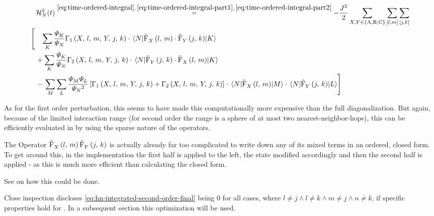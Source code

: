 \begin{equation}
    \label{eq:hn-integrated-second-order-final}
    \begin{split}
        &\HNOftOrder{2} \stackrel{\ref{eq:time-ordered-integral},\,\ref{eq:time-ordered-integral-part1},\,\ref{eq:time-ordered-integral-part2}}{=} 
        - \frac{J^2}{2} 
        \lsum[X,Y \in \left\{\text{A}, \text{B}, \text{C}\right\}] \fullneighborsum{l}{m}\fullneighborsum{j}{k}\\
        \left[         \vphantom{\lsum[K]}        \right.
        &\phantom{+}
        \lsum[K]
        \frac{\psiN[K]}{\psiN} 
        \Gamma_1 \left(X,\,l,\,m,\,Y,\,j,\,k\right)
        \cdot 
        \bracketHelper{N}{
            \VhamiltonianOperatorPart[]{$X$}{l}{m}
            \cdot 
            \VhamiltonianOperatorPart[]{$Y$}{j}{k}
            }{K}
        \\
        &+ 
        \lsum[K]
        \frac{\psiN[K]}{\psiN} 
        \Gamma_2 \left(X,\,l,\,m,\,Y,\,j,\,k\right)
        \cdot 
        \bracketHelper{N}{
            \VhamiltonianOperatorPart[]{$Y$}{j}{k}
        \cdot 
            \VhamiltonianOperatorPart[]{$X$}{l}{m}
        }{K} \\
        &-
        \left.
        \lsum[M]\lsum[L]
        \frac{\psiN[M]\psiN[L]}{\psiN{}^2}
            \left[\Gamma_1 \left(X,\,l,\,m,\,Y,\,j,\,k\right) + \Gamma_2 \left(X,\,l,\,m,\,Y,\,j,\,k\right)\right] \cdot
            \bracketHelper{N}{\VhamiltonianOperatorPart{$X$}{l}{m}}{M}
            \cdot
            \bracketHelper{N}{\VhamiltonianOperatorPart{$Y$}{j}{k}}{L}
        \right]
        \hspace{-1cm} %
    \end{split}
\end{equation}

As for the first order perturbation, this seems to have made this computationally more expensive than the full diagonalization.
But again, because of the limited interaction range (for second order the range is a sphere of at most two nearest-neighbor-hops), this can be efficiently evaluated in 
 by using the sparse nature of the operators.

The Operator $\VhamiltonianOperatorPart[]{$X$}{l}{m}\VhamiltonianOperatorPart[]{$Y$}{j}{k}$ is actually already far too complicated to write down any of its mixed terms in an ordered, closed form.
To get around this, in the implementation the first half is applied to the left, the state modified accordingly and then the second half is applied - as this is much more efficient than calculating the closed form.

See  on how this could be done.

Close inspection discloses \autoref{eq:hn-integrated-second-order-final} being $0$ for all cases, where $l \neq j \land l \neq k \land m \neq j \land n \neq k$, if specific properties hold for \psiN[\ast].
In a subsequent section this optimization will be used.
